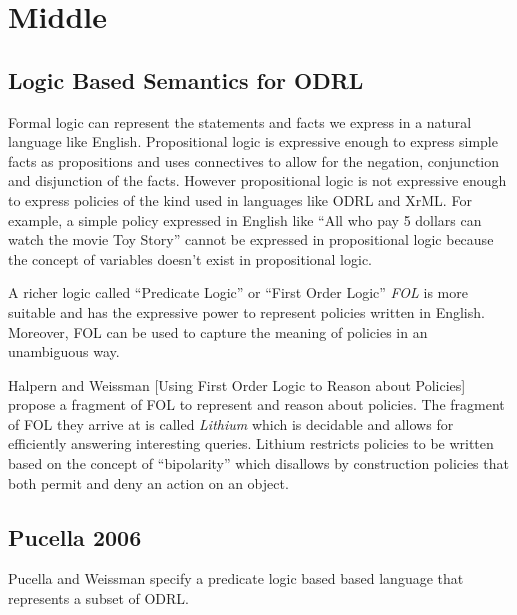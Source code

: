 \chapter{Middle}

\section{Logic Based Semantics for ODRL}


Formal logic can represent the statements and facts we express in a natural language like English. Propositional logic is expressive enough to express simple facts as propositions and uses connectives to allow for the negation, conjunction and disjunction of the facts. However propositional logic is not expressive enough to express policies of the kind used in languages like ODRL and XrML. For example, a simple policy expressed in English like ``All who pay 5 dollars can watch the movie Toy Story'' cannot be expressed in propositional logic because the concept of  variables doesn't exist in propositional logic. 

A richer logic called ``Predicate Logic'' or ``First Order Logic'' \emph{FOL} is more suitable and has the expressive power to represent policies written in English. Moreover, FOL can be used to capture the meaning of policies in an unambiguous way.

Halpern and Weissman [Using First Order Logic to Reason about Policies] propose a fragment of FOL to represent and reason about policies. The fragment of FOL they arrive at is called \emph{Lithium} which is decidable and allows for efficiently answering interesting queries. Lithium restricts policies to be written based on the concept of ``bipolarity'' which disallows by construction policies that both permit and deny an action on an object.

\section{Pucella 2006}
Pucella and Weissman \cite{pucella2006} specify a predicate logic based based language that represents a subset of ODRL.

